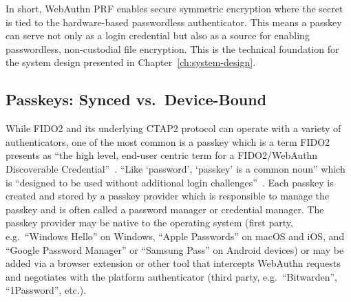In short, WebAuthn PRF enables secure symmetric encryption where the secret is tied to the hardware-based passwordless authenticator. This means a passkey can serve not only as a login credential but also as a source for enabling passwordless, non-custodial file encryption. This is the technical foundation for the system design presented in Chapter~\ref{ch:system-design}.

\subsection{Passkeys: Synced vs.\ Device-Bound}
\label{sec:passkey-types}

While FIDO2 and its underlying CTAP2 protocol can operate with a variety of authenticators, one of the most common is a passkey which is a term FIDO2 presents as ``the high level, end-user centric term for a FIDO2/WebAuthn Discoverable Credential''~\cite{passkeys_dev_terms}. ``Like `password', `passkey' is a common noun'' which is ``designed to be used without additional login challenges''~\cite{passkeys_dev_terms}. Each passkey is created and stored by a passkey provider which is responsible to manage the passkey and is often called a password manager or credential manager. The passkey provider may be native to the operating system (first party, e.g.\ ``Windows Hello'' on Windows, ``Apple Passwords'' on macOS and iOS, and ``Google Password Manager\texttrademark{}'' or ``Samsung Pass\texttrademark{}'' on Android devices) or may be added via a browser extension or other tool that intercepts WebAuthn requests and negotiates with the platform authenticator (third party, e.g.\ ``Bitwarden'', ``1Password'', etc.).


